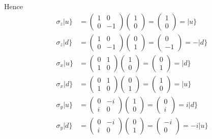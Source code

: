 \documentclass[12pt]{article}
\begin{document}
Hence
\begin{align*}
\sigma_z|u\}&=\begin{pmatrix}1&0\\0&-1\end{pmatrix}\begin{pmatrix}1\\0\end{pmatrix}=\begin{pmatrix}1\\0\end{pmatrix}=|u\}
\\[1ex]
\sigma_z|d\}&=\begin{pmatrix}1&0\\0&-1\end{pmatrix}\begin{pmatrix}0\\1\end{pmatrix}=\begin{pmatrix}0\\-1\end{pmatrix}=-|d\}
\\[1ex]
\sigma_x|u\}&=\begin{pmatrix}0&1\\1&0\end{pmatrix}\begin{pmatrix}1\\0\end{pmatrix}=\begin{pmatrix}0\\1\end{pmatrix}=|d\}
\\[1ex]
\sigma_x|d\}&=\begin{pmatrix}0&1\\1&0\end{pmatrix}\begin{pmatrix}0\\1\end{pmatrix}=\begin{pmatrix}1\\0\end{pmatrix}=|u\}
\\[1ex]
\sigma_y|u\}&=\begin{pmatrix}0&-i\\i&0\end{pmatrix}\begin{pmatrix}1\\0\end{pmatrix}=\begin{pmatrix}0\\i\end{pmatrix}=i|d\}
\\[1ex]
\sigma_y|d\}&=\begin{pmatrix}0&-i\\i&0\end{pmatrix}\begin{pmatrix}0\\1\end{pmatrix}=\begin{pmatrix}-i\\0\end{pmatrix}=-i|u\}
\end{align*}
\end{document}
